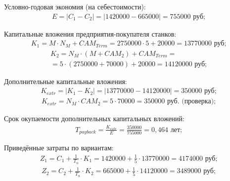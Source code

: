 Условно-годовая экономия (на себестоимости):
\begin{equation}
	\begin{aligned}
		E=|C_1-C_2|=|1420000-665000|=755 000 \text{ руб;}
	\end{aligned}
\end{equation}

Капитальные вложения предприятия-покупателя станков:
\begin{equation}
	\begin{aligned}
		K_1=M \cdot N_M+{CAM}_{Term}=2750000 \cdot 5+20000=13 770 000 \text{ руб;}
	\end{aligned}
\end{equation}
\begin{equation}
	\begin{aligned}
		K_2=N_M \cdot (M+{CAM}_2)+{CAM}_{Term}=\\=5 \cdot (2750000+70000)+20000 = 14 120 000 \text{ руб;}
	\end{aligned}
\end{equation}

Дополнительные капитальные вложения:
\begin{equation}
	\begin{aligned}
		K_{extr}=|K_1-K_2|=|13770000-14120000|=350 000 \text{ руб;}
	\end{aligned}
\end{equation}
\begin{equation}
	\begin{aligned}
		K_{extr}=N_M \cdot {CAM}_2=5 \cdot 70000=350 000 \text{ руб. (проверка);}
	\end{aligned}
\end{equation}

Срок окупаемости дополнительных капитальных вложений:
\begin{equation}
	\begin{aligned}
		T_{payback}=\frac{K_{extr}}{E}=\frac{350000}{755000}=0,464 \text{ лет;}
	\end{aligned}
\end{equation}

Приведённые затраты по вариантам:
\begin{equation}
	\begin{aligned}
		Z_1=C_1+\frac{1}{T_n} \cdot K_1=1420000+\frac{1}{5} \cdot 13770000=4 174 000 \text{ руб;}
	\end{aligned}
	\label{F:spends1}
\end{equation}
\begin{equation}
	\begin{aligned}
		Z_2=C_2+\frac{1}{T_n} \cdot K_2=665000+\frac{1}{5} \cdot 14120000=3489000 \text{ руб;}
	\end{aligned}
	\label{F:spends2}
\end{equation}

